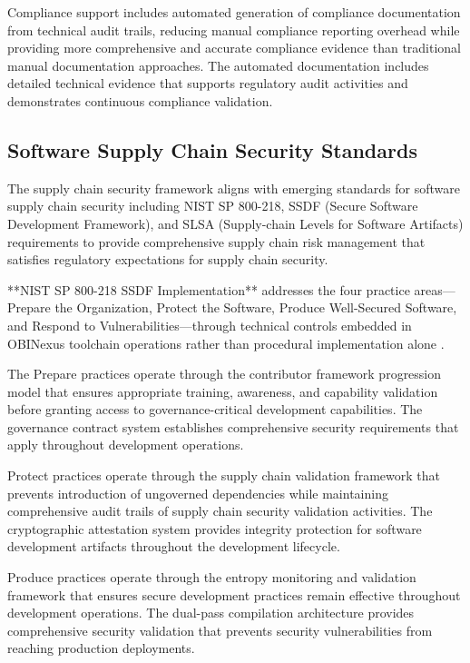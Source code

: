 Compliance support includes automated generation of compliance documentation from technical audit trails, reducing manual compliance reporting overhead while providing more comprehensive and accurate compliance evidence than traditional manual documentation approaches. The automated documentation includes detailed technical evidence that supports regulatory audit activities and demonstrates continuous compliance validation.

\subsection{Software Supply Chain Security Standards}

The supply chain security framework aligns with emerging standards for software supply chain security including NIST SP 800-218, SSDF (Secure Software Development Framework), and SLSA (Supply-chain Levels for Software Artifacts) requirements to provide comprehensive supply chain risk management that satisfies regulatory expectations for supply chain security.

**NIST SP 800-218 SSDF Implementation** addresses the four practice areas—Prepare the Organization, Protect the Software, Produce Well-Secured Software, and Respond to Vulnerabilities—through technical controls embedded in OBINexus toolchain operations rather than procedural implementation alone \cite{TODO:nist-800-218}.

The Prepare practices operate through the contributor framework progression model that ensures appropriate training, awareness, and capability validation before granting access to governance-critical development capabilities. The governance contract system establishes comprehensive security requirements that apply throughout development operations.

Protect practices operate through the supply chain validation framework that prevents introduction of ungoverned dependencies while maintaining comprehensive audit trails of supply chain security validation activities. The cryptographic attestation system provides integrity protection for software development artifacts throughout the development lifecycle.

Produce practices operate through the entropy monitoring and validation framework that ensures secure development practices remain effective throughout development operations. The dual-pass compilation architecture provides comprehensive security validation that prevents security vulnerabilities from reaching production deployments.

